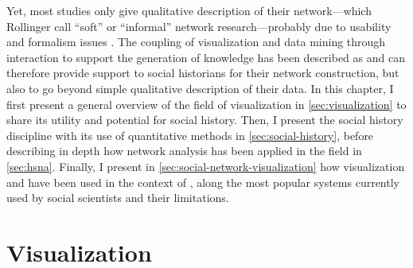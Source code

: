 Yet, most \hsna studies only give qualitative description of their network---which Rollinger call ``soft'' or ``informal'' network research---probably due to usability and formalism issues\cite{alkadi2022} .
The coupling of visualization and data mining through interaction to support the generation of knowledge has been described as \va and can therefore provide support to social historians for their network construction, but also to go beyond simple qualitative description of their data.
In this chapter, I first present a general overview of the field of visualization in \autoref{sec:visualization} to share its utility and potential for social history.
Then, I present the social history discipline with its use of quantitative methods in \autoref{sec:social-history}, before describing in depth how network analysis has been applied in the field in \autoref{sec:hsna}.
Finally, I present in \autoref{sec:social-network-visualization} how visualization and \va have been used in the context of \hsna, along the most popular systems currently used by social scientists and their limitations.







\section{Visualization}\label{sec:visualization}

